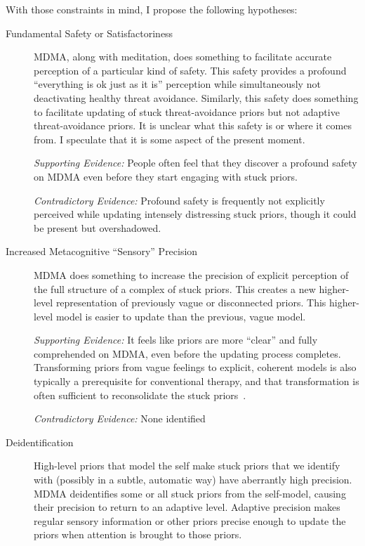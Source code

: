 \documentclass[11pt,oneside]{book}
\let\cite\parencite
\begin{document}
With those constraints in mind, I propose the following hypotheses:
\begin{description}
    \item[Fundamental Safety or Satisfactoriness] MDMA, along with meditation, does something to facilitate accurate perception of a particular kind of safety. This safety provides a profound \enquote{everything is ok just as it is} perception while simultaneously not deactivating healthy threat avoidance. Similarly, this safety does something to facilitate updating of stuck threat-avoidance priors but not adaptive threat-avoidance priors. It is unclear what this safety is or where it comes from. I speculate that it is some aspect of the present moment.
        
    \textit{Supporting Evidence:} People often feel that they discover a profound safety on MDMA even before they start engaging with stuck priors.

    \textit{Contradictory Evidence:} Profound safety is frequently not explicitly perceived while updating intensely distressing stuck priors, though it could be present but overshadowed.

    \item[Increased Metacognitive \enquote{Sensory} Precision] MDMA does something to increase the precision of explicit perception of the full structure of a complex of stuck priors. This creates a new higher-level representation of previously vague or disconnected priors. This higher-level model is easier to update than the previous, vague model.

    \textit{Supporting Evidence:} It feels like priors are more \enquote{clear} and fully comprehended on MDMA, even before the updating process completes. Transforming priors from vague feelings to explicit, coherent models is also typically a prerequisite for conventional therapy, and that transformation is often sufficient to reconsolidate the stuck priors~\cite{eckerUnlocking}.

    \textit{Contradictory Evidence:} None identified

    \item[Deidentification] High-level priors that model the self make stuck priors that we identify with (possibly in a subtle, automatic way) have aberrantly high precision. MDMA deidentifies some or all stuck priors from the self-model, causing their precision to return to an adaptive level. Adaptive precision makes regular sensory information or other priors precise enough to update the priors when attention is brought to those priors.
    

\end{description}
\end{document}
